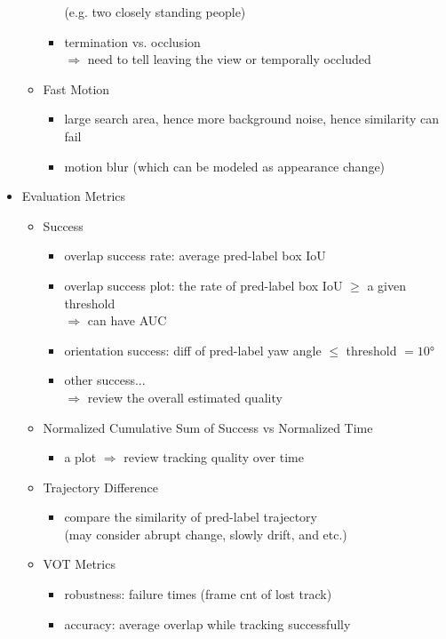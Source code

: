 \begin{itemize}
\begin{itemize}
\begin{itemize}
		(e.g. two closely standing people)
		\item termination vs. occlusion \\
		$\Rightarrow$ need to tell leaving the view or temporally occluded
		\end{itemize}
	\item Fast Motion
		\begin{itemize}
		\item large search area, hence more background noise, hence similarity can fail
		\item motion blur (which can be modeled as appearance change)
		\end{itemize}
	\end{itemize}
\item Evaluation Metrics
	\begin{itemize}
	\item Success
		\begin{itemize}
		\item overlap success rate: average pred-label box IoU
		\item overlap success plot: the rate of pred-label box IoU $\ge$ a given threshold \\
		$\Rightarrow$ can have AUC
		\item orientation success: diff of pred-label yaw angle $\le$ threshold $=\ang{10}$
		\item other success... \\
		$\Rightarrow$ review the overall estimated quality
		\end{itemize}
	\item Normalized Cumulative Sum of Success vs Normalized Time
		\begin{itemize}
		\item a plot $\Rightarrow$ review tracking quality over time
		\end{itemize}
	\item Trajectory Difference
		\begin{itemize}
		\item compare the similarity of pred-label trajectory \\
		(may consider abrupt change, slowly drift, and etc.)
		\end{itemize}
	\item VOT Metrics
		\begin{itemize}
		\item robustness: failure times (frame cnt of lost track)
		\item accuracy: average overlap while tracking successfully

\end{itemize}
\end{itemize}
\end{itemize}
